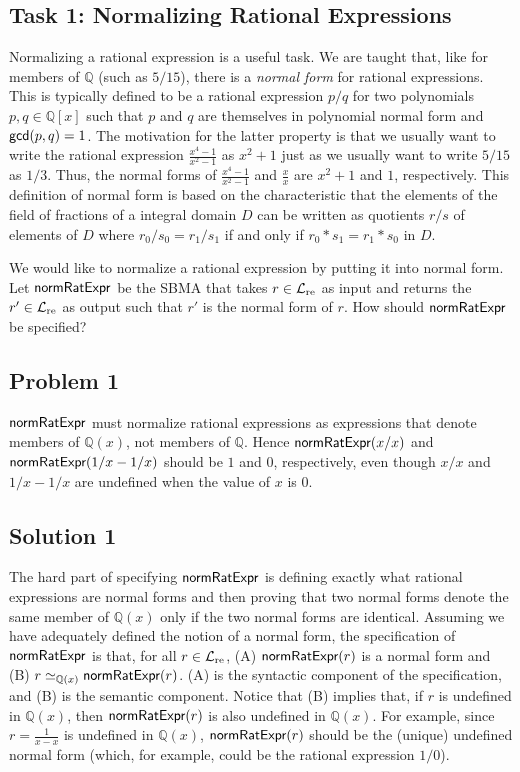 \documentclass[fleqn]{llncs}
\newcommand{\QQ}{\ensuremath{\mathbb{Q}}}
\newcommand{\NRE}{\ensuremath{\mname{normRatExpr}}}
\newcommand{\Langre}{\ensuremath{\mathcal{L}}_{\rm re}}
\begin{document}
\subsection{Task 1: Normalizing Rational Expressions}

Normalizing a rational expression is a useful task.  We are taught
that, like for members of $\QQ$ (such as $5/15$), there is a
\emph{normal form} for rational expressions. This is typically defined
to be a rational expression $p/q$ for two polynomials $p,q \in \QQ[x]$
such that $p$ and $q$ are themselves in polynomial normal form and
$\mbox{\sf gcd}(p,q) = 1$.  The motivation for the latter property is
that we usually want to write the rational expression
$\frac{x^4-1}{x^2-1}$ as $x^2 + 1$ just as we usually want to write
$5/15$ as $1/3$.  Thus, the normal forms of $\frac{x^4-1}{x^2-1}$ and
$\frac{x}{x}$ are $x^2 + 1$ and $1$, respectively.  This definition of
normal form is based on the characteristic that the elements of the
field of fractions of a integral domain $D$ can be written as
quotients $r/s$ of elements of $D$ where $r_0/s_0 = r_1/s_1$ if and
only if $r_0 * s_1 = r_1 * s_0$ in $D$.

We would like to normalize a rational expression by putting it into
normal form.  Let $\NRE$ be the SBMA that takes $r \in \Langre$ as
input and returns the $r' \in \Langre$ as output such that $r'$ is the
normal form of $r$.  How should $\NRE$ be specified?

\subsection{Problem 1}

\bsp $\NRE$ must normalize rational expressions as expressions that
denote members of $\QQ(x)$, not members of $\QQ$.  Hence $\NRE(x/x)$
and $\NRE(1/x - 1/x)$ should be $1$ and $0$, respectively, even though
$x/x$ and $1/x - 1/x$ are undefined when the value of $x$ is 0.  \esp

\subsection{Solution 1}

The hard part of specifying $\NRE$ is defining exactly what rational
expressions are normal forms and then proving that two normal forms
denote the same member of $\QQ(x)$ only if the two normal forms are
identical.  Assuming we have adequately defined the notion of a normal
form, the specification of $\NRE$ is that, for all $r \in \Langre$,
(A) $\NRE(r)$ is a normal form and (B) $r \simeq_{\QQ(x)} \NRE(r)$.
(A) is the syntactic component of the specification, and (B) is the
semantic component.  Notice that (B) implies that, if $r$ is undefined
in $\QQ(x)$, then $\NRE(r)$ is also undefined in $\QQ(x)$.  For
example, since $r = \frac{1}{x - x}$ is undefined in $\QQ(x)$,
$\NRE(r)$ should be the (unique) undefined normal form (which, for example,
could be the rational expression $1/0$).
\end{document}
